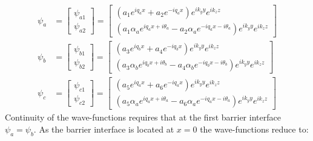 \documentclass[12pt,a4paper]{article}
\begin{document}
		\begin{align}
			\psi_{a}&=
			\left[\begin{array}{ccc}
				\psi_{a1}\\
				\psi_{a2}
			\end{array}\right]
			=
			\left[\begin{array}{ccc}
				\left(a_{1}e^{iq_{a}x}+a_{2}e^{-iq_{a}x}\right)e^{ik_{y}y}e^{ik_{z}z}\\
				\left(a_{1}\alpha_{a}e^{iq_{a}x+i\theta_{a}}-a_{2}\alpha_{a}e^{-iq_{a}x-i\theta_{a}}\right)e^{ik_{y}y}e^{ik_{z}z}
			\end{array}\right]
			\\
			\psi_{b}&=
			\left[\begin{array}{ccc}
				\psi_{b1}\\
				\psi_{b2}
			\end{array}\right]
			=
			\left[\begin{array}{ccc}
				\left(a_{3}e^{iq_{b}x}+a_{4}e^{-iq_{b}x}\right)e^{ik_{y}y}e^{ik_{z}z}\\
				\left(a_{3}\alpha_{b}e^{iq_{b}x+i\theta_{b}}-a_{4}\alpha_{b}e^{-iq_{b}x-i\theta_{b}}\right)e^{ik_{y}y}e^{ik_{z}z}
			\end{array}\right]
			\\
			\psi_{c}&=
			\left[\begin{array}{ccc}
				\psi_{c1}\\
				\psi_{c2}
			\end{array}\right]
			=
			\left[\begin{array}{ccc}
				\left(a_{5}e^{iq_{a}x}+a_{6}e^{-iq_{a}x}\right)e^{ik_{y}y}e^{ik_{z}z}\\
				\left(a_{5}\alpha_{a}e^{iq_{a}x+i\theta_{a}}-a_{6}\alpha_{a}e^{-iq_{a}x-i\theta_{a}}\right)e^{ik_{y}y}e^{ik_{z}z}
			\end{array}\right]
		\end{align}
Continuity of the wave-functions requires that at the first barrier interface $\psi_{a}=\psi_{b}$. As the barrier interface is located at $x=0$ the wave-functions reduce to:
\end{document}
